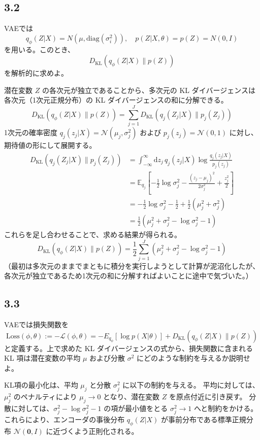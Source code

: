 \documentclass[11pt,a4paper,dvipdfmx]{article}
\numberwithin{equation}{section}
\newenvironment{proofbox}[0]
{
    \begin{mdframed}[
        linecolor=black,
        topline=false,
        bottomline=false,
        rightline=false,
        leftline=true,
        linewidth=2pt,
        innerleftmargin=10pt,
        skipabove=\baselineskip,
        skipbelow=\baselineskip,
    ]
}
{
    \end{mdframed}
}
\newenvironment{note}[0]
{
    \begin{tcolorbox}[sharp corners, colframe=gray!20, colback=gray!20, width=\textwidth]
}
{
    \end{tcolorbox}
}
\begin{document}
\subsection*{3.2}
\begin{note}
VAEでは
\[ q_\phi(Z|X) = N (\mu, \mathrm{diag}(\sigma^2_i)), \quad p (Z|X, \theta) = p(Z) = N (0, I) \]
を用いる。このとき、
\[ D_{\mathrm{KL}}(q_\phi(Z|X) \parallel p(Z)) \]
を解析的に求めよ。
\end{note}
\begin{proofbox}
潜在変数 $Z$ の各次元が独立であることから、多次元の KL ダイバージェンスは各次元（1次元正規分布）の KL ダイバージェンスの和に分解できる。
\[
D_{\mathrm{KL}}(q_\phi(Z|X) \parallel p(Z)) = \sum_{j=1}^J D_{\mathrm{KL}}(q_j(Z_j|X) \parallel p_j(Z_j))
\]
1次元の確率密度 $q_j(z_j|X) = \mathcal{N}(\mu_j, \sigma_j^2)$ および $p_j(z_j) = \mathcal{N}(0, 1)$ に対し、期待値の形にして展開する。
\[
\begin{aligned}
D_{\mathrm{KL}}(q_j(Z_j|X) \parallel p_j(Z_j)) &= \int_{-\infty}^{\infty} \mathrm{d}z_j \, q_j(z_j|X) \log \frac{q_j(z_j|X)}{p_j(z_j)} \\
&= \mathbb{E}_{q_j} \left[ -\frac{1}{2}\log\sigma_j^2 - \frac{(z_j - \mu_j)^2}{2\sigma_j^2} + \frac{z_j^2}{2} \right] \\
&= -\frac{1}{2}\log\sigma_j^2 - \frac{1}{2} + \frac{1}{2}(\mu_j^2 + \sigma_j^2) \\
&= \frac{1}{2} \left( \mu_j^2 + \sigma_j^2 - \log \sigma_j^2 - 1 \right)
\end{aligned}
\]
これらを足し合わせることで、求める結果が得られる。
\[
D_{\mathrm{KL}}(q_\phi(Z|X) \parallel p(Z)) = \frac{1}{2} \sum_{j=1}^J \left( \mu_j^2 + \sigma_j^2 - \log \sigma_j^2 - 1 \right)
\]
（最初は多次元のままでまともに積分を実行しようとして計算が泥沼化したが、各次元が独立であるため1次元の和に分解すればよいことに途中で気づいた。）
\end{proofbox}

\subsection*{3.3}
\begin{note}
VAEでは損失関数を
\[ \mathrm{Loss}(\phi, \theta) := -\mathcal{L}(\phi, \theta) = -E_{q_\phi} [\log p(X|\theta)] + D_{\mathrm{KL}}(q_\phi(Z|X) \parallel p(Z)) \]
と定義する。上で求めた KL ダイバージェンスの式から、損失関数に含まれる KL 項は潜在変数の平均 $\mu$ および分散 $\sigma^2$ にどのような制約を与えるか説明せよ。
\end{note}
\begin{proofbox}
KL項の最小化は、平均 $\mu_j$ と分散 $\sigma_j^2$ に以下の制約を与える。
平均に対しては、$\mu_j^2$ のペナルティにより $\mu_j \to 0$ となり、潜在変数 $Z$ を原点付近に引き戻す。
分散に対しては、$\sigma_j^2 - \log \sigma_j^2 - 1$ の項が最小値をとる $\sigma_j^2 \to 1$ へと制約をかける。
これらにより、エンコーダの事後分布 $q_\phi(Z|X)$ が事前分布である標準正規分布 $\mathcal{N}(\bm{0}, I)$ に近づくよう正則化される。
\end{proofbox}
\end{document}
